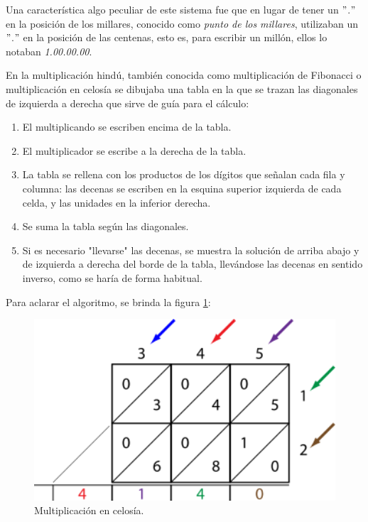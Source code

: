 \documentclass[a4paper, 11pt]{article}
\begin{document}
		Una característica algo peculiar de este sistema fue que en lugar de tener un $"$.$"$ en la posición de los millares,
		conocido como \textit{punto de los millares}, utilizaban un $"$.$"$ en la posición de las centenas, esto es, para
		escribir un millón, ellos lo notaban \textit{1.00.00.00}.

		En la multiplicación hindú, también conocida como multiplicación de Fibonacci o multiplicación en celosía se
		dibujaba una tabla en la que se trazan las diagonales de izquierda a derecha que sirve de guía para el cálculo:
		\begin{enumerate}
			\item El multiplicando se escriben encima de la tabla.
			\item El multiplicador se escribe a la derecha de la tabla.
			\item La tabla se rellena con los productos de los dígitos que señalan cada fila y columna: las decenas se
			escriben en la esquina superior izquierda de cada celda, y las unidades en la inferior derecha.
			\item Se suma la tabla según las diagonales.
			\item Si es necesario "llevarse" las decenas, se muestra la solución de arriba abajo y de izquierda a derecha
			del borde de la tabla, llevándose las decenas en sentido inverso, como se haría de forma habitual.
		\end{enumerate}

		Para aclarar el algoritmo, se brinda la figura \ref{fig:ind_multiplication}:

		\begin{figure}[!ht]
			\centering
			\includegraphics[width = 14cm]{indian_multiplication.png}
			\caption{Multiplicación en celosía.}
			\label{fig:ind_multiplication}
		\end{figure}
		
\end{document}
